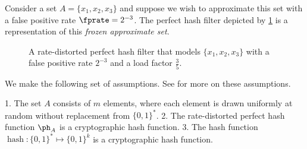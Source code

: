 


\begin{example}
Consider a set $A = \{x_1, x_2, x_3\}$ and suppose we wish to approximate this set with a false positive rate $\fprate = 2^{-3}$. The perfect hash filter depicted by \cref{fig:PHFilter} is a representation of this \emph{frozen approximate set}.
\end{example}
\begin{figure}
\caption[Perfect hash filter]{A rate-distorted perfect hash filter that models  $\{x_1,x_2,x_3\}$ with a false positive rate $2^{-3}$ and a load factor $\frac{3}{5}$.}
\label{fig:PHFilter}
\centering

\end{figure}

We make the following set of assumptions. See \cite{oph} for more on these assumptions.

    1. The set $A$ consists of $m$ elements, where each element is drawn uniformly at random without replacement from $\{0,1\}^*$.
    2. The rate-distorted perfect hash function $\ph_{A}$ is a cryptographic hash function.
    3. The hash function $\operatorname{hash} \colon \{0,1\}^* \mapsto \{0,1\}^k$ is a cryptographic hash function.

